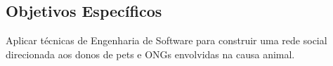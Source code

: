     

\subsection{Objetivos Específicos}
\label{subsec:ObjetivosEspecificos}
Aplicar técnicas de Engenharia de Software para construir uma rede social direcionada aos donos de pets e ONGs envolvidas na causa animal.
     






    
